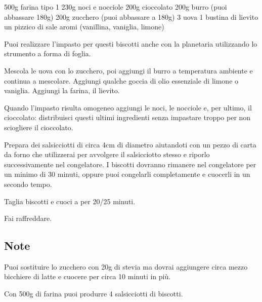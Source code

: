\begin{ingreds}
	500g farina tipo 1
	230g noci e nocciole
	200g cioccolato
	200g burro (puoi abbassare 180g)
	200g zucchero (puoi abbassare a 180g)
	3 uova
	1 bustina di lievito
	un pizzico di sale
	aromi (vanillina, vaniglia, limone)

\end{ingreds}

\begin{method}
Puoi realizzare l'impasto per questi biscotti anche con la planetaria utilizzando lo strumento a forma di foglia.

Mescola le uova con lo zucchero, poi aggiungi il burro a temperatura ambiente e continua a mescolare. Aggiungi qualche goccia di olio essenziale di limone o vaniglia. Aggiungi la farina, il lievito.

Quando l'impasto risulta omogeneo aggiungi le noci, le nocciole e, per ultimo, il cioccolato: distribuisci questi ultimi ingredienti senza impastare troppo per non sciogliere il cioccolato.
	
Prepara dei salsicciotti di circa 4cm di diametro aiutandoti con un pezzo di carta da forno che utilizzerai per avvolgere il salsicciotto stesso e riporlo successivamente nel congelatore. I biscotti dovranno rimanere nel congelatore per un minimo di 30 minuti, oppure puoi congelarli completamente e cuocerli in un secondo tempo.
	
Taglia biscotti e cuoci a  per 20/25 minuti.

Fai raffreddare.

\end{method}

\subsection*{Note}
		Puoi sostituire lo zucchero con 20g di stevia ma dovrai aggiungere circa mezzo bicchiere di latte e cuocere per circa 10 minuti in più.
		
		Con 500g di farina puoi produrre 4 salsicciotti di biscotti.
